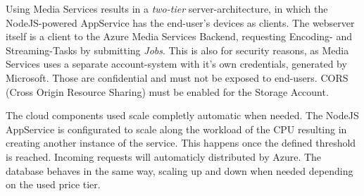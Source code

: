 Using Media Services results in a \textit{two-tier} server-architecture, in which the NodeJS-powered AppService has the end-user's devices as clients. The webserver itself is a client to the Azure Media Services Backend, requesting Encoding- and Streaming-Tasks by submitting \textit{Jobs}. This is also for security reasons, as Media Services uses a separate account-system with it's own credentials, generated by Microsoft. Those are confidential and must not be exposed to end-users. CORS (Cross Origin Resource Sharing) must be enabled for the Storage Account. 

The cloud components used scale completly automatic when needed. The NodeJS AppService is configurated to scale along the workload of the CPU resulting in creating another instance of the service. This happens once the defined threshold is reached. Incoming requests will automaticly distributed by Azure. The database behaves in the same way, scaling up and down when needed depending on the used price tier.